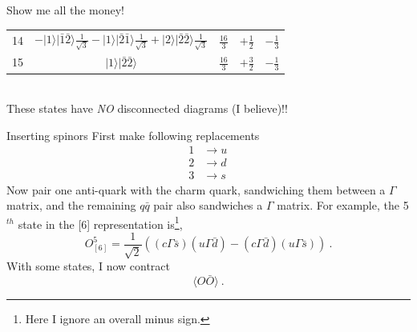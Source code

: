 \documentclass{beamer}
\begin{document}
\begin{frame}{Show me all the money!}
\begin{tabular}{c|c|c|c|c}
14& $-|1\rangle|\bar{1}\bar{2}\rangle\frac{1}{\sqrt{3}}-|1\rangle|\bar{2}\bar{1}\rangle\frac{1}{\sqrt{3}}+|2\rangle|\bar{2}\bar{2}\rangle\frac{1}{\sqrt{3}}$ &$\frac{16}{3}$ &$+\frac{1}{2}$ & $-\frac{1}{3}$\\
15& $|1\rangle|\bar{2}\bar{2}\rangle$ &$\frac{16}{3}$ &$+\frac{3}{2}$ & $-\frac{1}{3}$\\
\hline\hline
\end{tabular}\\
{\color{blue} These states have \emph{NO} disconnected diagrams (I believe)!!}
\end{frame}

\begin{frame}{Inserting spinors}
\footnotesize
First make following replacements
\begin{align*}
1&\to u\\
2&\to d\\
3&\to s\ 
\end{align*}
Now pair one anti-quark with the charm quark, sandwiching them between a $\Gamma$ matrix, and the remaining $q\bar{q}$ pair also sandwiches a $\Gamma$ matrix.  For example, the 5$^{th}$ state in the [6] representation is\footnote{Here I ignore an overall minus sign.},
\begin{displaymath}
O^5_{[6]}=\frac{1}{\sqrt{2}}\left(\left(c\Gamma \bar{s}\right)\left(u\Gamma \bar{d}\right)-\left(c\Gamma \bar{d}\right)\left(u\Gamma \bar{s}\right)\right)\ .
\end{displaymath}
With some states, I now contract
\begin{displaymath}
\langle O\bar{O}\rangle\ .
\end{displaymath}
\end{frame}
\end{document}
